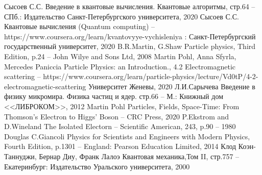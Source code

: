\documentclass[11pt]{article}
\begin{document}
\begin{thebibliography}{3}
Сысоев С.С. Введение в квантовые вычисления. Квантовые алгоритмы, стр.64 -- СПб.: Издательство Санкт-Петербургского университета, 2020
Сысоев С.С. Квантовые вычисления (Quantum computing) -- https://www.coursera.org/learn/kvantovyye-vychisleniya : Санкт-Петербургский государственный университет, 2020
B.R.Martin, G.Shaw Particle physics, Third Edition, p.24 -- John Wilye and Sons Ltd, 2008
Martin Pohl, Anna Sfyrla, Mercedes Paniccia Particle Physics: an Introduction., 4.2 Electromagnetic scattering -- https://www.coursera.org/learn/particle-physics/lecture/Vd0tP/4-2-electromagnetic-scattering Университет Женевы, 2020
Л.И.Сарычева Введение в физику микромира. Физика частиц и ядер. стр.66 -- М.: Книжный дом <<ЛИБРОКОМ>>, 2012 
Martin Pohl Particles, Fields, Space-Time: From Thomson's Electron to Higgs' Boson -- CRC Press, 2020
P.Ekstrom and D.Wineland The Isolated Electorn -- Scientific American, 243, p.90 -- 1980
Douglas C.Giancoli Physics for Scientists and Engineers with Modern Physics, Fourth Edition, p.1301 -- England: Pearson Education Limited, 2014 
Клод Коэн-Таннуджи, Бернар Диу, Франк Лалоэ Квантовая механика,Том II, стр.757 -- Екатеринбург: Издательство Уральского университета, 2000 

\end{thebibliography}
\end{document}
